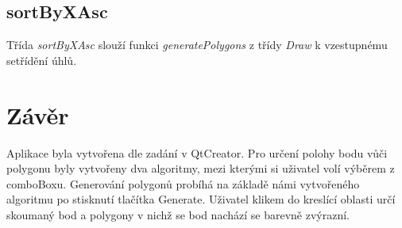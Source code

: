 \documentclass{article}
\begin{document}
\subsection{sortByXAsc}
Třída \emph{sortByXAsc} slouží funkci \emph{generatePolygons} z třídy \emph{Draw} k vzestupnému setřídění úhlů.
\newpage
\section{Závěr}
Aplikace byla vytvořena dle zadání v QtCreator. Pro určení polohy bodu vůči polygonu byly vytvořeny dva algoritmy, mezi kterými si uživatel volí výběrem z comboBoxu. Generování polygonů probíhá na základě námi vytvořeného algoritmu po stisknutí tlačítka Generate. Uživatel klikem do kreslící oblasti určí skoumaný bod a polygony v nichž se bod nachází se barevně zvýrazní.


\end{document}
